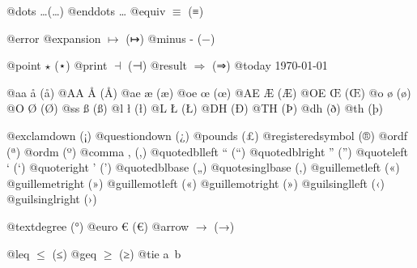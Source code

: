 \documentclass{book}
\renewcommand{\_}{\Texinfounderscore\discretionary{}{}{}}
\begin{document}
\begin{titlepage}
{@dots \dots{}\@ (…)
@enddots \dots{}
@equiv $\equiv{}$ (≡)

@error 
@expansion $\mapsto{}$ (↦)
@minus - (−)

@point $\star{}$ (⋆)
@print $\dashv{}$ (⊣)
@result $\Rightarrow{}$ (⇒)
@today \today{}

@aa \aa{} (å)
@AA \AA{} (Å)
@ae \ae{} (æ)
@oe \oe{} (œ)
@AE \AE{} (Æ)
@OE \OE{} (Œ)
@o \o{} (ø)
@O \O{} (Ø)
@ss \ss{} (ß)
@l \l{} (ł)
@L \L{} (Ł)
@DH \DH{} (Ð)
@TH \TH{} (Þ)
@dh \dh{} (ð)
@th \th{} (þ)

@exclamdown \textexclamdown{} (¡)
@questiondown \textquestiondown{} (¿)
@pounds \textsterling{} (£)
@registeredsymbol \circledR{} (®)
@ordf \textordfeminine{} (ª)
@ordm \textordmasculine{} (º)
@comma , (,)
@quotedblleft \textquotedblleft{} (“)
@quotedblright \textquotedblright{} (”)
@quoteleft \textquoteleft{} (‘)
@quoteright \textquoteright{} (’)
@quotedblbase \quotedblbase{} („)
@quotesinglbase \quotesinglbase{} (‚)
@guillemetleft \guillemotleft{} («)
@guillemetright \guillemotright{} (»)
@guillemotleft \guillemotleft{} («)
@guillemotright \guillemotright{} (»)
@guilsinglleft \guilsinglleft{} (‹)
@guilsinglright \guilsinglright{} (›)

@textdegree \textdegree{} (°)
@euro \euro{} (€)
@arrow $\rightarrow{}$ (→)

@leq $\leq{}$ (≤)
@geq $\geq{}$ (≥)
@tie a~b

}
\end{titlepage}
\end{document}

